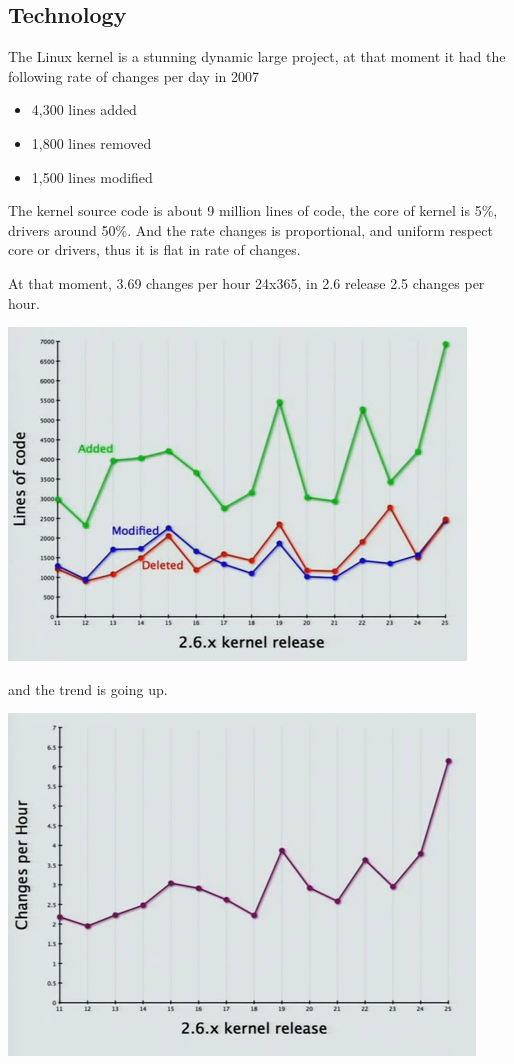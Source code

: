 \documentclass[11pt]{article}
\begin{document}
\subsection{Technology}
The Linux kernel is a stunning dynamic large project, at that moment it had the following rate of changes per day in 2007
\begin{itemize}
	\item 4,300 lines added
	\item 1,800 lines removed
	\item 1,500 lines modified
\end{itemize}
The kernel source code is about 9 million lines of code, the core of kernel is 5\%, drivers around 50\%. And the rate changes is proportional, and uniform respect core or drivers, thus it is flat in rate of changes.

At that moment, 3.69 changes per hour 24x365, in 2.6 release 2.5 changes per hour.

\hfill\includegraphics[scale=0.8]{img/26kernelChanges}\hspace*{\fill}

and the trend is going up.

\hfill\includegraphics[scale=0.8]{img/changePerHour}\hspace*{\fill}
\end{document}
